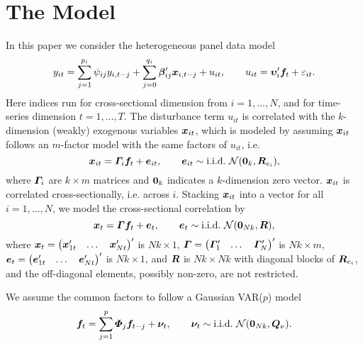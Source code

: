 \section{The Model}
In this paper we consider the heterogeneous panel data model
\begin{equation}
\label{eq_model}
	y_{it}=\sum^{p_i}_{j=1}\psi_{ij}y_{i,t-j}+\sum^{q_i}_{j=0}\bm \beta_{ij}'\bm x_{i,t-j}+u_{it},\qquad
	u_{it}=\bm \upsilon'_i\bm f_t+\varepsilon_{it}.
\end{equation}
Here indices run for cross-sectional dimension from $i=1,\dots,N$, and for time-series dimension $t=1,\dots,T$. The disturbance term $u_{it}$ is correlated with the $k$-dimension (weakly) exogenous variables $\bm x_{it}$, which is modeled by assuming $\bm x_{it}$ follows an $m$-factor model with the same factors of $u_{it}$, i.e.
\begin{equation}
	\bm x_{it}=\bm \varGamma_i\bm f_t+\bm e_{it},\qquad
	\bm e_{it}\sim\text{i.i.d.}~\mathcal{N}(\boldsymbol{0}_k,\bm R_{e_i}),
\end{equation}
where $\bm \varGamma_i$ are $k\times m$ matrices and $\boldsymbol{0}_k$ indicates a $k$-dimension zero vector. $\bm x_{it}$ is correlated cross-sectionally, i.e. across $i$. Stacking $\bm x_{it}$ into a vector for all $i=1,\dots,N$, we model the cross-sectional correlation by
\begin{equation}
\label{eq_X}
	\bm x_t=\bm \varGamma \bm f_t+\bm e_t,\qquad
	\bm e_t\sim\text{i.i.d.}~\mathcal{N}(\boldsymbol{0}_{Nk},\bm R),
\end{equation}
where 
$\bm x_t=	
	\begin{pmatrix}
		\bm x_{1t}'&\dots&\bm x_{Nt}'
	\end{pmatrix}'$ is $Nk\times1$,
$\bm \varGamma=
	\begin{pmatrix}
		\bm \varGamma_1'&\dots&\bm \varGamma_N'
	\end{pmatrix}'$ is $Nk\times m$,
$\bm e_t=
	\begin{pmatrix}
		\bm e_{1t}'&\dots&\bm e_{Nt}'
	\end{pmatrix}'$ is $Nk\times1$, and 
$\bm R$ is $Nk\times Nk$ with diagonal blocks of $\bm R_{e_i}$, and the off-diagonal elements, possibly non-zero, are not restricted.

We assume the common factors to follow a Gaussian VAR($p$) model
\begin{equation}
\label{eq_f}
	\bm f_t=\sum^{p}_{j=1}\bm \varPhi_j\bm f_{t-j}+\bm \nu_t,\qquad
	\bm \nu_t\sim\text{i.i.d.}~\mathcal{N}(\boldsymbol{0}_{Nk},\bm Q_\nu).
\end{equation}

